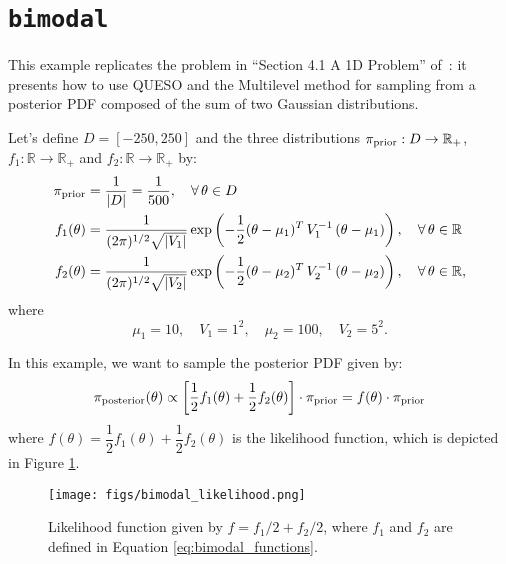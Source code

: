 \section{\texttt{bimodal}}\label{sec:example_bimodal}


This example replicates the problem in ``Section 4.1 A 1D Problem'' of~\cite{CheungPrudencio2012}: it presents how to use QUESO and the Multilevel method for sampling from a posterior PDF composed of the sum of two Gaussian distributions. 

Let's define $D=[-250,250]$ and the three distributions $\pi_{\text{prior}}: D \rightarrow \mathbb{R}_+ $, $f_1: \mathbb{R} \rightarrow \mathbb{R}_+ $ and $f_2: \mathbb{R} \rightarrow \mathbb{R}_+$ by:
\begin{equation}
\begin{split}\label{eq:bimodal_functions}
\pi_{\text{prior}} &=  \dfrac{1}{|D|} = \dfrac{1}{500}, \quad \forall \,  \theta \in D \\
f_1(\theta) &= \dfrac{1}{(2\pi)^{1/2} \sqrt{|V_1|}} \exp \left(-\dfrac{1}{2}(\theta - \mu_1)^T \, V_1^{-1} \, (\theta - \mu_1) \right), \quad \forall \,  \theta \in \mathbb{R} \\
f_2(\theta) &= \dfrac{1}{(2\pi)^{1/2} \sqrt{|V_2|}} \exp \left(-\dfrac{1}{2}(\theta - \mu_2)^T \, V_2^{-1} \, (\theta - \mu_2) \right), \quad \forall \, \theta \in \mathbb{R},
\end{split}
\end{equation}
where
\begin{equation*}
\mu_1 = 10, \quad  V_1 = 1^2, \quad \mu_2 = 100, \quad V_2= 5^2.
\end{equation*}

In this example, we want to sample the posterior PDF given by:
\begin{equation}
\pi_{\text{posterior}}(\theta)  \propto \left[\dfrac{1}{2} f_1(\theta) + \dfrac{1}{2} f_2(\theta) \right] \cdot \pi_{\text{prior}} = f(\theta) \cdot \pi_{\text{prior}}
\end{equation}
where $f(\theta)= \dfrac{1}{2} f_1(\theta) + \dfrac{1}{2} f_2(\theta)$ is the likelihood function, which is depicted in Figure \ref{fig:bimodal:likelihood}.

\begin{figure}[htpb]
\centering
\texttt{[image: figs/bimodal\_likelihood.png]}
\vspace{-10pt}
\caption{Likelihood function given by $f=f_1/2+ f_2/2$, where $f_1$ and $f_2$ are defined in Equation \eqref{eq:bimodal_functions}.}
\label{fig:bimodal:likelihood}
\end{figure}


